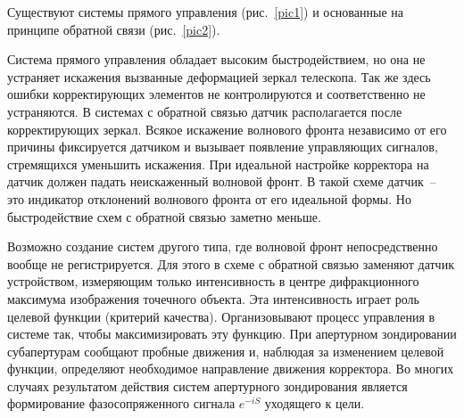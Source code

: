 \documentclass[pscyr]{hedwork}
\newcommand{\pic}[1]{\ref{pic#1}}
\begin{document}
Существуют системы прямого управления (рис.~\pic{1}) и основанные на принципе
обратной связи (рис.~\pic{2}).

Система прямого управления обладает высоким быстродействием, но она не устраняет
искажения вызванные деформацией зеркал телескопа. Так же здесь ошибки
корректирующих элементов не контролируются и соответственно не устраняются. В
системах с обратной связью датчик располагается после корректирующих зеркал.
Всякое искажение волнового фронта независимо от его причины фиксируется датчиком
и вызывает появление управляющих сигналов, стремящихся уменьшить искажения. При
идеальной настройке корректора на датчик должен падать неискаженный волновой
фронт. В такой схеме датчик~-- это индикатор отклонений волнового фронта от его
идеальной формы. Но быстродействие схем с обратной связью заметно меньше.

Возможно создание систем другого типа, где волновой фронт непосредственно вообще
не регистрируется. Для этого в схеме с обратной связью заменяют датчик
устройством, измеряющим только интенсивность в центре дифракционного максимума
изображения точечного объекта. Эта интенсивность играет роль целевой функции
(критерий качества). Организовывают процесс управления в системе так, чтобы
максимизировать эту функцию. При апертурном зондировании субапертурам сообщают
пробные движения и, наблюдая за изменением целевой функции, определяют
необходимое направление движения корректора. Во многих случаях результатом
действия систем апертурного зондирования является формирование фазосопряженного
сигнала \( e^{-iS} \) уходящего к цели.
\end{document}
